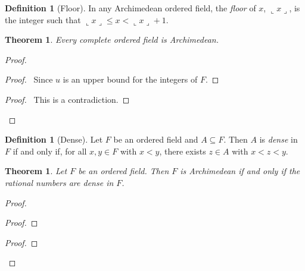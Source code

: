 \documentclass{article}
\let\qed\relax
\newtheorem{theorem}[axiom]{Theorem}
\theoremstyle{definition}
\newtheorem{definition}[axiom]{Definition}
\begin{document}
    \begin{definition}[Floor]
        In any Archimedean ordered field, the \emph{floor} of $x$, $\llcorner x \lrcorner$, is the integer
        such that $\llcorner x \lrcorner \leq x < \llcorner x \lrcorner + 1$.
    \end{definition}

    \begin{theorem}
        Every complete ordered field is Archimedean.
    \end{theorem}

    \begin{proof}
        \pf
        \begin{proof}
            \pf\ Since $u$ is an upper bound for the integers of $F$.
        \end{proof}
        \qedstep
        \begin{proof}
            \pf\ This is a contradiction.
        \end{proof}
        \qed
    \end{proof}

    \begin{definition}[Dense]
        Let $F$ be an ordered field and $A \subseteq F$. Then $A$ is \emph{dense} in $F$ if and only if,
        for all $x, y \in F$ with $x < y$, there exists $z \in A$ with $x < z < y$.
    \end{definition}

    \begin{theorem}
        \label{theorem:rationals_dense}
        Let $F$ be an ordered field. Then $F$ is Archimedean if and only if the rational numbers are dense
        in $F$.
    \end{theorem}

    \begin{proof}
        \pf
        \begin{proof}
        \end{proof}
        \begin{proof}
        \end{proof}
        \qed
    \end{proof}
\end{document}
